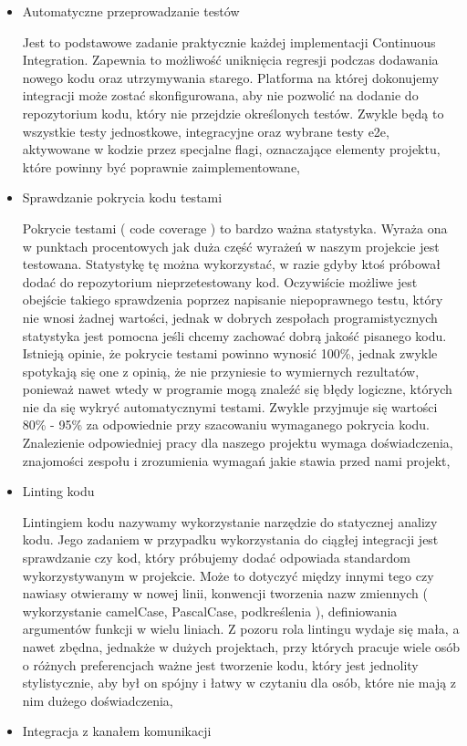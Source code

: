 \begin{itemize}
    \item Automatyczne przeprowadzanie testów 
    
    Jest to podstawowe zadanie praktycznie każdej implementacji Continuous Integration. Zapewnia to możliwość uniknięcia regresji podczas dodawania nowego kodu oraz utrzymywania starego. 
    Platforma na której dokonujemy integracji może zostać skonfigurowana, aby nie pozwolić na dodanie do repozytorium kodu, który nie przejdzie określonych testów. Zwykle będą to wszystkie testy jednostkowe, integracyjne oraz wybrane testy e2e, aktywowane w kodzie przez specjalne flagi, oznaczające elementy projektu, które powinny być poprawnie zaimplementowane,
    \item Sprawdzanie pokrycia kodu testami
    
    Pokrycie testami ( code coverage ) to bardzo ważna statystyka. Wyraża ona w punktach procentowych jak duża część wyrażeń w naszym projekcie jest testowana. Statystykę tę można wykorzystać, w razie gdyby ktoś próbował dodać do repozytorium nieprzetestowany kod. Oczywiście możliwe jest obejście takiego sprawdzenia poprzez napisanie niepoprawnego testu, który nie wnosi żadnej wartości, jednak w dobrych zespołach programistycznych statystyka jest pomocna jeśli chcemy zachować dobrą jakość pisanego kodu. Istnieją opinie, że pokrycie testami powinno wynosić 100\%, jednak zwykle spotykają się one z opinią, że nie przyniesie to wymiernych rezultatów, ponieważ nawet wtedy w programie mogą znaleźć się błędy logiczne, których nie da się wykryć automatycznymi testami. Zwykle przyjmuje się wartości 80\% - 95\% za odpowiednie przy szacowaniu wymaganego pokrycia kodu. Znalezienie odpowiedniej pracy dla naszego projektu wymaga doświadczenia, znajomości zespołu i zrozumienia wymagań jakie stawia przed nami projekt,
    \item Linting kodu
    
    Lintingiem kodu nazywamy wykorzystanie narzędzie do statycznej analizy kodu. Jego zadaniem w przypadku wykorzystania do ciągłej integracji jest sprawdzanie czy kod, który próbujemy dodać odpowiada standardom wykorzystywanym w projekcie. Może to dotyczyć między innymi tego czy nawiasy otwieramy w nowej linii, konwencji tworzenia nazw zmiennych ( wykorzystanie camelCase, PascalCase, podkreślenia ), definiowania argumentów funkcji w wielu liniach. Z pozoru rola lintingu wydaje się mała, a nawet zbędna, jednakże w dużych projektach, przy których pracuje wiele osób o różnych preferencjach ważne jest tworzenie kodu, który jest jednolity stylistycznie, aby był on spójny i łatwy w czytaniu dla osób, które nie mają z nim dużego doświadczenia,
    \item Integracja z kanałem komunikacji
    

\end{itemize}
